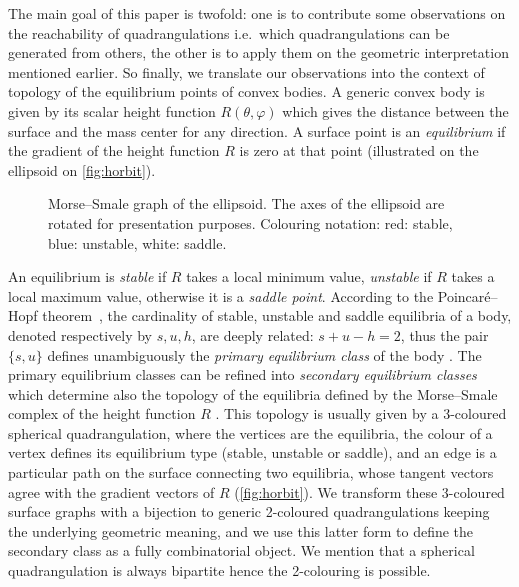 \documentclass[]{article}
\begin{document}
The main goal of this paper is twofold: one is to contribute some observations on the reachability of quadrangulations i.e.\  which quadrangulations can be generated from others, the other is to apply them on the geometric interpretation mentioned earlier.
So finally, we translate our observations into the context of topology of the equilibrium points of convex bodies.
A generic convex body is given by its scalar height function $R(\theta, \varphi)$ which gives the distance between the surface and the mass center for any direction.
A surface point is an \emph{equilibrium} if the gradient of the height function $R$ is zero at that point (illustrated on the ellipsoid on \autoref{fig:horbit}).
\begin{figure}


  \caption{Morse--Smale graph of the ellipsoid.
The axes of the ellipsoid are rotated for presentation purposes.
Colouring notation:  red: stable, blue: unstable, white: saddle.
}
  \label{fig:horbit}
\end{figure}
An equilibrium is \emph{stable} if $R$ takes a local minimum value, \emph{unstable} if $R$ takes a local maximum value, otherwise it is a \emph{saddle point}.
According to the Poincaré--Hopf theorem~\cite{Arnold1978}, the cardinality of stable, unstable and saddle equilibria of a body, denoted respectively by $s,u,h$, are deeply related: $s+u-h=2$,
thus the pair $\{s,u\}$ defines unambiguously the \emph{primary equilibrium class} of the body \cite{Domokos2006}.
The primary equilibrium classes can be refined into \emph{secondary equilibrium classes} which determine also the topology of the equilibria defined by the Morse--Smale complex of the height function $R$ \cite{Domokos2012}.
This topology is usually given by a 3-coloured spherical quadrangulation,
where the vertices are the equilibria, the colour of a vertex defines its equilibrium type (stable, unstable or saddle), and
an edge is a particular path on the surface connecting two equilibria, whose tangent vectors agree with the gradient vectors of $R$ (\autoref{fig:horbit}).
We transform these 3-coloured surface graphs with a bijection to generic 2-coloured quadrangulations keeping the underlying geometric meaning, and we use this latter form to define the secondary class as a fully combinatorial object.
We mention that a spherical quadrangulation is always bipartite \cite{Archdeacon2001,Gross2004} hence the 2-colouring is possible.
\end{document}
